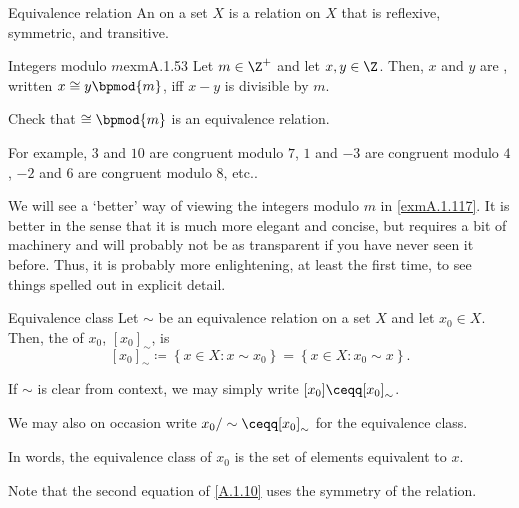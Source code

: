 \begin{dfn}{Equivalence relation}{}
An  on a set $X$ is a relation on $X$ that is reflexive, symmetric, and transitive.
\end{dfn}
\begin{exm}{Integers modulo $m$}{exmA.1.53}
Let $m\in \Z ^+$ and let $x,y\in \Z$.  Then, $x$ and $y$ are , written $x\cong y\bpmod{m}$, iff $x-y$ is divisible by $m$.
\begin{exr}{}{}
Check that $\cong \bpmod{m}$ is an equivalence relation.
\end{exr}
For example, $3$ and $10$ are congruent modulo $7$, $1$ and $-3$ are congruent modulo $4$, $-2$ and $6$ are congruent modulo $8$, etc..
\begin{rmk}
We will see a `better' way of viewing the integers modulo $m$ in \cref{exmA.1.117}.  It is better in the sense that it is much more elegant and concise, but requires a bit of machinery and will probably not be as transparent if you have never seen it before.  Thus, it is probably more enlightening, at least the first time, to see things spelled out in explicit detail.
\end{rmk}
\end{exm}
\begin{dfn}{Equivalence class}{}
Let $\sim$ be an equivalence relation on a set $X$ and let $x_0\in X$.  Then, the  of $x_0$, $[x_0]_\sim$\index[notation]{$[x_0]_\sim$}, is
\begin{equation}\label{A.1.10}
[x_0]_\sim \coloneqq \left\{ x\in X:x\sim x_0\right\} =\left\{ x\in X:x_0\sim x\right\} .
\end{equation}
\begin{rmk}
If $\sim$ is clear from context, we may simply write $[x_0]\ceqq [x_0]_{\sim}$\index[notation]{$[x_0]$}.
\end{rmk}
\begin{rmk}
We may also on occasion write $x_0/\sim \ceqq [x_0]_{\sim}$ for the equivalence class.
\end{rmk}
\begin{rmk}
In words, the equivalence class of $x_0$ is the set of elements equivalent to $x$.
\end{rmk}
\begin{rmk}
Note that the second equation of \eqref{A.1.10} uses the symmetry of the relation.
\end{rmk}
\end{dfn}

